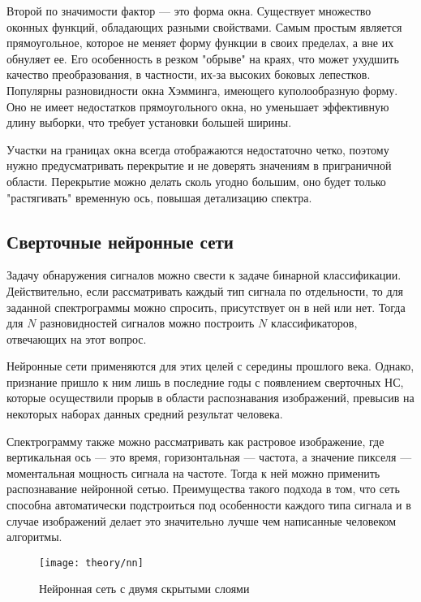 Второй по значимости фактор --- это форма окна. Существует множество оконных функций, обладающих разными свойствами. Самым простым является прямоугольное, которое не меняет форму функции в своих пределах, а вне их обнуляет ее. Его особенность в резком "обрыве" на краях, что может ухудшить качество преобразования, в частности, их-за высоких боковых лепестков. Популярны разновидности окна Хэмминга, имеющего куполообразную форму. Оно не имеет недостатков прямоугольного окна, но уменьшает эффективную длину выборки, что требует установки большей ширины.

Участки на границах окна всегда отображаются недостаточно четко, поэтому нужно предусматривать перекрытие и не доверять значениям в приграничной области. Перекрытие можно делать сколь угодно большим, оно будет только "растягивать" временную ось, повышая детализацию спектра.


\subsection{Сверточные нейронные сети}

Задачу обнаружения сигналов можно свести к задаче бинарной классификации. Действительно, если рассматривать каждый тип сигнала по отдельности, то для заданной спектрограммы можно спросить, присутствует он в ней или нет. Тогда для $N$ разновидностей сигналов можно построить $N$ классификаторов, отвечающих на этот вопрос.

Нейронные сети применяются для этих целей с середины прошлого века. Однако, признание пришло к ним лишь в последние годы с появлением сверточных НС, которые осуществили прорыв в области распознавания изображений, превысив на некоторых наборах данных средний результат человека.

Спектрограмму также можно рассматривать как растровое изображение, где вертикальная ось --- это время, горизонтальная --- частота, а значение пикселя --- моментальная мощность сигнала на частоте. Тогда к ней можно применить распознавание нейронной сетью. Преимущества такого подхода в том, что сеть способна автоматически подстроиться под особенности каждого типа сигнала и в случае изображений делает это значительно лучше чем написанные человеком алгоритмы.

\begin{figure}[h]
  \centering
  \texttt{[image: theory/nn]}
  \caption{Нейронная сеть с двумя скрытыми слоями}
  \label{fig:theory:nn}
\end{figure}

